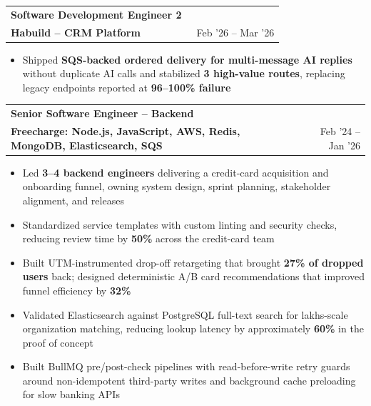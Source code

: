 \documentclass[a4paper,10pt]{article}
\makeatletter
\newcommand{\resumeSubheading}[4]{
  \vspace{-1pt}\item
    \begin{tabular*}{0.97\textwidth}{l@{\extracolsep{\fill}}r}
      \textbf{#1} & #2 \\
      {#3} & {#4} \\
    \end{tabular*}\vspace{-5pt}
}
\makeatother
\begin{document}
  \resumeSubheading
    {Software Development Engineer 2}{}
    {\textbf{Habuild -- CRM Platform}}{\faCalendar\ Feb '26 -- Mar '26}
    \begin{itemize}
      \item{Shipped \textbf{SQS-backed ordered delivery for multi-message AI replies} without duplicate AI calls and stabilized \textbf{3 high-value routes}, replacing legacy endpoints reported at \textbf{96--100\% failure}}
    \end{itemize}
    \vspace{-4pt}

  \resumeSubheading
    {Senior Software Engineer -- Backend}{}
    {\textbf{Freecharge: Node.js, JavaScript, AWS, Redis, MongoDB, Elasticsearch, SQS}}{\faCalendar\ Feb '24 -- Jan '26}
    \begin{itemize}
      \item{Led \textbf{3--4 backend engineers} delivering a credit-card acquisition and onboarding funnel, owning system design, sprint planning, stakeholder alignment, and releases}
      \vspace{-2pt}
      \item{Standardized service templates with custom linting and security checks, reducing review time by \textbf{50\%} across the credit-card team}
      \vspace{-2pt}
      \item{Built UTM-instrumented drop-off retargeting that brought \textbf{27\% of dropped users} back; designed deterministic A/B card recommendations that improved funnel efficiency by \textbf{32\%}}
      \vspace{-2pt}
      \item{Validated Elasticsearch against PostgreSQL full-text search for lakhs-scale organization matching, reducing lookup latency by approximately \textbf{60\%} in the proof of concept}
      \vspace{-2pt}
      \item{Built BullMQ pre/post-check pipelines with read-before-write retry guards around non-idempotent third-party writes and background cache preloading for slow banking APIs}
    \end{itemize}
    \vspace{-4pt}
\end{document}
